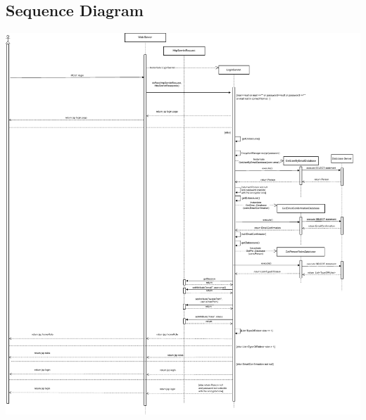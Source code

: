 \subsection{Sequence Diagram}

\includegraphics[width=\columnwidth,height=\textheight]{resources/Sequence_Diagram.pdf}


